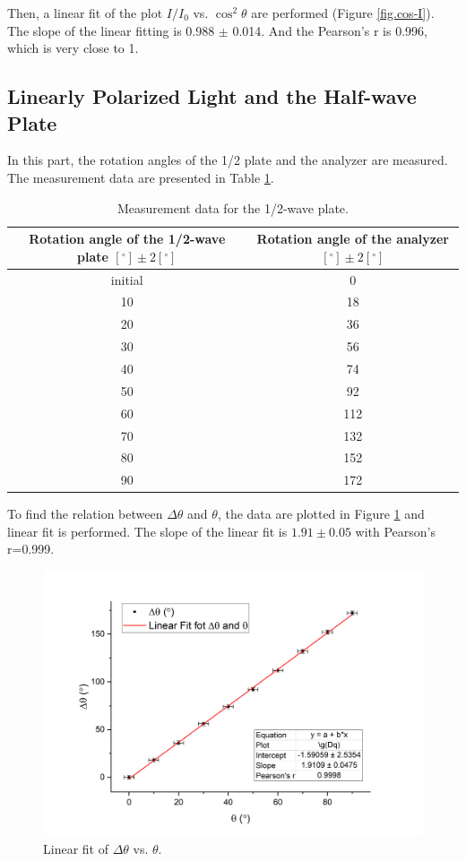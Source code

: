 \documentclass{article}
\begin{document}
Then, a linear fit of the plot $I/I_0$ vs. $\cos^2\theta$ are performed (Figure \ref{fig.cos-I}). The slope of the linear fitting is 0.988 $\pm$ 0.014. And the Pearson's r is 0.996, which is very close to 1.

\subsection{Linearly Polarized Light and the Half-wave Plate}

In this part, the rotation angles of the 1/2 plate and the analyzer are measured. The measurement data are presented in Table \ref{Table1/2}. 

\begin{table}[H]\centering
\begin{tabular}{cc}
\toprule
Rotation angle of the 1/2-wave plate $[^\circ] \pm 2[^\circ]$ & Rotation angle of the analyzer $[^\circ] \pm 2[^\circ]$\\
\midrule 
initial & 0 \\
10 & 18 \\
20 & 36 \\
30 & 56 \\
40 & 74 \\
50 & 92 \\
60 & 112 \\
70 & 132 \\
80 & 152 \\
90 & 172 \\
\bottomrule
\end{tabular}
\caption{Measurement data for the 1/2-wave plate.}\label{Table1/2}
\end{table}

To find the relation between $\Delta\theta$ and $\theta$, the data are plotted in Figure \ref{fig.theta} and linear fit is performed. The slope of the linear fit is $1.91 \pm 0.05$ with Pearson's r=0.999.

\begin{figure}[H]\centering
\includegraphics[scale=0.6]{2.png}
\caption{Linear fit of $\Delta\theta$ vs. $\theta$.}\label{fig.theta}
\end{figure}
\end{document}
